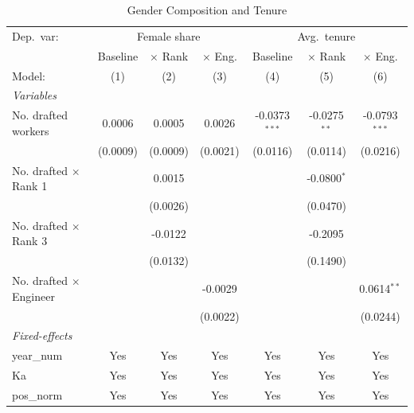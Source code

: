 \begin{table}[htbp]
\centering
\caption{Gender Composition and Tenure}
\label{tab:gender}
\small
\begin{threeparttable}
\begin{tabular}{lcccccc}
\midrule Dep.\ var: & \multicolumn{3}{c}{Female share} & \multicolumn{3}{c}{Avg.\ tenure} \\
                                  & Baseline & $\times$ Rank  & $\times$ Eng.  & Baseline        & $\times$ Rank  & $\times$ Eng. \\    
   Model:                         & (1)      & (2)            & (3)            & (4)             & (5)            & (6)\\  
   \midrule
   \emph{Variables}\\
   No. drafted workers            & 0.0006   & 0.0005         & 0.0026         & -0.0373$^{***}$ & -0.0275$^{**}$ & -0.0793$^{***}$\\   
                                  & (0.0009) & (0.0009)       & (0.0021)       & (0.0116)        & (0.0114)       & (0.0216)\\   
   No. drafted $\times$ Rank 1    &          & 0.0015         &                &                 & -0.0800$^{*}$  &   \\   
                                  &          & (0.0026)       &                &                 & (0.0470)       &   \\   
   No. drafted $\times$ Rank 3    &          & -0.0122        &                &                 & -0.2095        &   \\   
                                  &          & (0.0132)       &                &                 & (0.1490)       &   \\   
   No. drafted $\times$ Engineer  &          &                & -0.0029        &                 &                & 0.0614$^{**}$\\   
                                  &          &                & (0.0022)       &                 &                & (0.0244)\\   
   \midrule
   \emph{Fixed-effects}\\
   year\_num                      & Yes      & Yes            & Yes            & Yes             & Yes            & Yes\\  
   Ka                             & Yes      & Yes            & Yes            & Yes             & Yes            & Yes\\  
   pos\_norm                      & Yes      & Yes            & Yes            & Yes             & Yes            & Yes\\  

\end{tabular}
\end{threeparttable}
\end{table}
